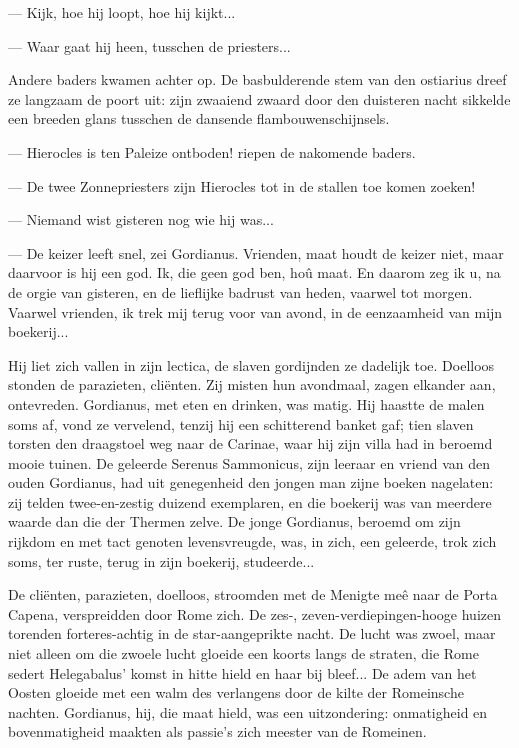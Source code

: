 \documentclass[a4paper, 12pt, oneside, dutch]{article}
\begin{document}
--- Kijk, hoe hij loopt, hoe hij kijkt...

--- Waar gaat hij heen, tusschen de priesters...

Andere baders kwamen achter op. De basbulderende stem van den ostiarius dreef ze langzaam de poort uit: zijn zwaaiend zwaard door den duisteren nacht sikkelde een breeden glans tusschen de dansende flambouwenschijnsels.

--- Hierocles is ten Paleize ontboden! riepen de nakomende baders.

--- De twee Zonnepriesters zijn Hierocles tot in de stallen toe komen zoeken!

--- Niemand wist gisteren nog wie hij was...

--- De keizer leeft snel, zei Gordianus. Vrienden, maat houdt de keizer niet, maar daarvoor is hij een god. Ik, die geen god ben, hoû maat. En daarom zeg ik u, na de orgie van gisteren, en de lieflijke badrust van heden, vaarwel tot morgen. Vaarwel vrienden, ik trek mij terug voor van avond, in de eenzaamheid van mijn boekerij...

Hij liet zich vallen in zijn lectica, de slaven gordijnden ze dadelijk toe. Doelloos stonden de parazieten, cliënten. Zij misten hun avondmaal, zagen elkander aan, ontevreden. Gordianus, met eten en drinken, was matig. Hij haastte de malen soms af, vond ze vervelend, tenzij hij een schitterend banket gaf; tien slaven torsten den draagstoel weg naar de Carinae, waar hij zijn villa had in beroemd mooie tuinen. De geleerde Serenus Sammonicus, zijn leeraar en vriend van den ouden Gordianus, had uit genegenheid den jongen man zijne boeken nagelaten: zij telden twee-en-zestig duizend exemplaren, en die boekerij was van meerdere waarde dan die der Thermen zelve. De jonge Gordianus, beroemd om zijn rijkdom en met tact genoten levensvreugde, was, in zich, een geleerde, trok zich soms, ter ruste, terug in zijn boekerij, studeerde...

De cliënten, parazieten, doelloos, stroomden met de Menigte meê naar de Porta Capena, verspreidden door Rome zich. De zes-, zeven-verdiepingen-hooge huizen torenden forteres-achtig in de star-aangeprikte nacht. De lucht was zwoel, maar niet alleen om die zwoele lucht gloeide een koorts langs de straten, die Rome sedert Helegabalus' komst in hitte hield en haar bij bleef... De adem van het Oosten gloeide met een walm des verlangens door de kilte der Romeinsche nachten. Gordianus, hij, die maat hield, was een uitzondering: onmatigheid en bovenmatigheid maakten als passie's zich meester van de Romeinen.
\end{document}
